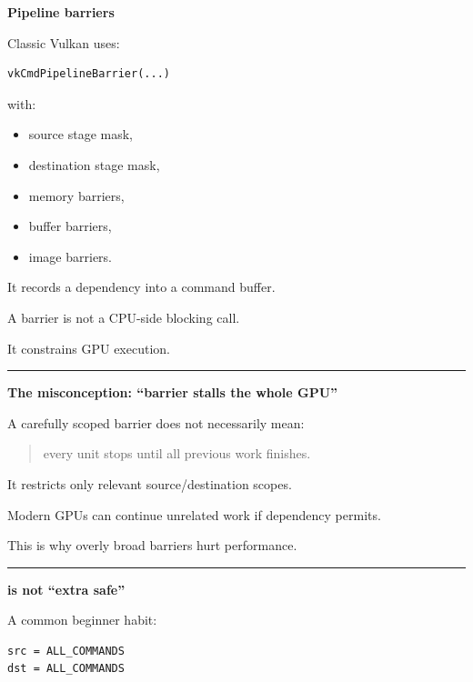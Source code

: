 \textbf{Pipeline barriers}

Classic Vulkan uses:

\begin{verbatim}
vkCmdPipelineBarrier(...)
\end{verbatim}

with:

\begin{itemize}
\tightlist
\item
  source stage mask,
\item
  destination stage mask,
\item
  memory barriers,
\item
  buffer barriers,
\item
  image barriers.
\end{itemize}

It records a dependency into a command buffer.

A barrier is not a CPU-side blocking call.

It constrains GPU execution.

\begin{center}\rule{0.5\linewidth}{0.5pt}\end{center}

\textbf{The misconception: ``barrier stalls the whole GPU''}

A carefully scoped barrier does not necessarily mean:

\begin{quote}
every unit stops until all previous work finishes.
\end{quote}

It restricts only relevant source/destination scopes.

Modern GPUs can continue unrelated work if dependency permits.

This is why overly broad barriers hurt performance.

\begin{center}\rule{0.5\linewidth}{0.5pt}\end{center}

\textbf{ is not ``extra safe''}

A common beginner habit:

\begin{verbatim}
src = ALL_COMMANDS
dst = ALL_COMMANDS
\end{verbatim}

